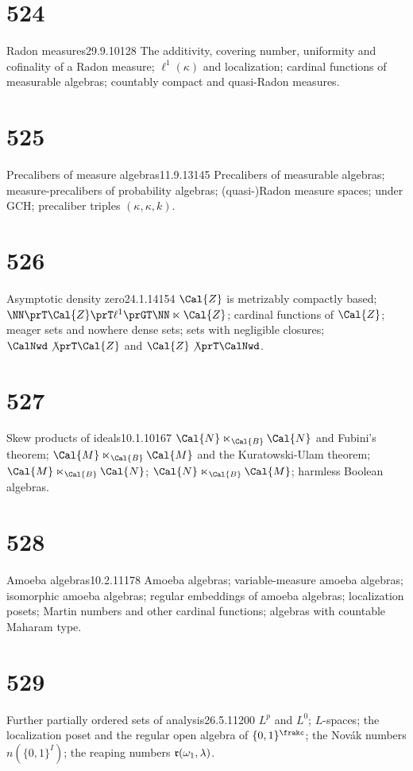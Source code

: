 \section{524}{Radon measures}{29.9.10}{}{128}
{The additivity, covering number, uniformity and cofinality of a Radon
measure;  $\ell^1(\kappa)$ and localization;  cardinal functions of
measurable algebras;  countably compact and quasi-Radon
measures.}

\section{525}{Precalibers of measure algebras}{11.9.13}{}{145}
{Precalibers of measurable algebras;  measure-precalibers of probability
algebras;  (quasi-\nobreak)Radon measure spaces;  under GCH;  precaliber
triples $(\kappa,\kappa,k)$.}

\section{526}{Asymptotic density zero}{24.1.14}{}{154}
{$\Cal{Z}$ is metrizably compactly based;
$\NN\prT\Cal{Z}\prT\ell^1\prGT\NN\ltimes\Cal{Z}$;  cardinal functions
of $\Cal{Z}$;  meager sets and nowhere dense sets;  sets with negligible
closures;  $\CalNwd\not\prT\Cal{Z}$ and $\Cal{Z}\not\prT\CalNwd$.}

\section{527}{Skew products of ideals}{10.1.10}{}{167}
{$\Cal{N}\ltimes_{\Cal{B}}\Cal{N}$ and Fubini's theorem;
$\Cal{M}\ltimes_{\Cal{B}}\Cal{M}$ and the Kuratowski-Ulam theorem;
$\Cal{M}\ltimes_{\Cal{B}}\Cal{N}$;
$\Cal{N}\ltimes_{\Cal{B}}\Cal{M}$;  harmless Boolean algebras.}

\section{528}{Amoeba algebras}{10.2.11}{}{178}
{Amoeba algebras;  variable-measure amoeba algebras;  isomorphic amoeba
algebras;  regular embeddings of amoeba algebras;  localization
posets;  Martin numbers and other cardinal functions;  algebras with
countable Maharam type.}

\section{529}{Further partially ordered sets of
analysis}{26.5.11}{}{200}
{$L^p$ and $L^0$;  $L$-spaces;  the localization poset and the regular
open algebra of $\{0,1\}^{\frakc}$;  the Nov\'ak numbers $n(\{0,1\}^I)$;  
the reaping numbers $\frak{r}(\omega_1,\lambda)$.}

